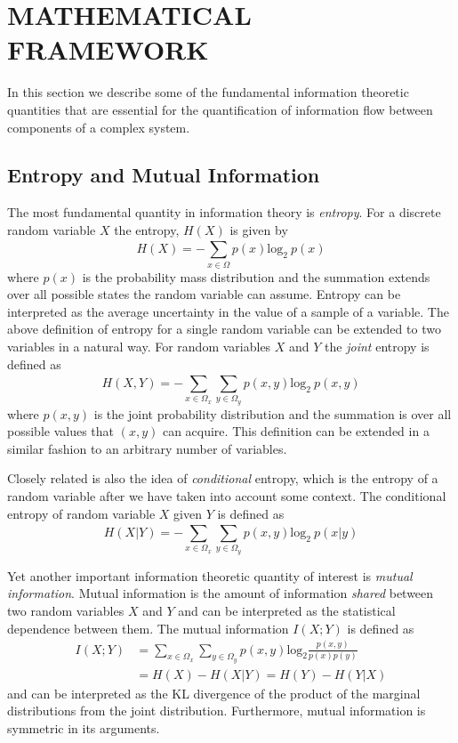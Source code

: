 \documentclass[letterpaper, 10 pt, conference]{ieeeconf}  %
\begin{document}
\section{MATHEMATICAL FRAMEWORK}\label{sec:math}
In this section we describe some of the fundamental information theoretic quantities that are essential for the quantification of information flow between components of a complex system. 
\subsection{Entropy and Mutual Information}
The most fundamental quantity in information theory is \textit{entropy}. For a discrete random variable $X$ the entropy, $H(X)$ is given by
\begin{equation*}
	H(X) = -\sum_{x \in \Omega}^{} p(x)\text{log}_{2}~p(x)
\end{equation*}
where $p(x)$ is the probability mass distribution and the summation extends over all possible states the random variable can assume. Entropy can be interpreted as the average uncertainty in the value of a sample of a variable. 
The above definition of entropy for a single random variable can be extended to two variables in a natural way. For random variables $X$ and $Y$ the \textit{joint} entropy is defined as 
\begin{equation*}
H(X, Y) = -\sum_{x \in \Omega_x}^{}\sum_{y \in \Omega_y}^{}p(x,y)\text{log}_2~p(x,y)
\end{equation*}
where $p(x,y)$ is the joint probability distribution and the summation is over all possible values that $(x,y)$ can acquire. This definition can be extended in a similar fashion to an arbitrary number of variables. 

Closely related is also the idea of \textit{conditional} entropy, which is the entropy of a random variable after we have taken into account some context. The conditional entropy of random variable $X$ given $Y$ is defined as 
\begin{equation*}
H(X|Y) = -\sum_{x \in \Omega_x}^{}\sum_{y \in \Omega_y}^{}p(x, y)\text{log}_2~p(x|y)
\end{equation*}

Yet another important information theoretic quantity of interest is \textit{mutual information}. Mutual information is the amount of information \textit{shared} between two random variables $X$ and $Y$ and can be interpreted as the statistical dependence between them. The mutual information $I(X;Y)$ is defined as 
\begin{align*}
I(X;Y) &= \sum_{x \in \Omega_x}^{}\sum_{y \in \Omega_y}^{}p(x,y)\text{log}_2\frac{p(x,y)}{p(x)p(y)} \\
&=  H(X) - H(X|Y) = H(Y) - H(Y|X)
\end{align*}
and can be interpreted as the KL divergence of the product of the marginal distributions from the joint distribution. Furthermore, mutual information is symmetric in its arguments. 
\end{document}
